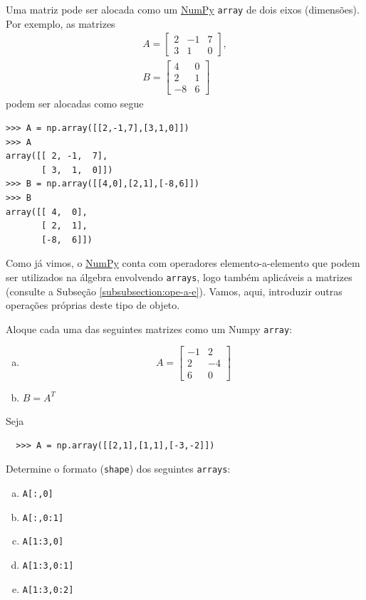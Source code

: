 \documentclass[12pt]{article}
\begin{document}
Uma matriz pode ser alocada como um \href{https://numpy.org/}{NumPy} \lstinline+array+ de dois eixos (dimensões). Por exemplo, as matrizes
\begin{gather}
  A =
  \begin{bmatrix}
    2 & -1 & 7\\
    3 & 1 & 0
  \end{bmatrix},\\
  B =
  \begin{bmatrix}
    4 & 0\\
    2 & 1\\
   -8 & 6
  \end{bmatrix}
\end{gather}
podem ser alocadas como segue
\begin{lstlisting}
>>> A = np.array([[2,-1,7],[3,1,0]])
>>> A
array([[ 2, -1,  7],
       [ 3,  1,  0]])
>>> B = np.array([[4,0],[2,1],[-8,6]])
>>> B
array([[ 4,  0],
       [ 2,  1],
       [-8,  6]])
\end{lstlisting}


Como já vimos, o \href{https://numpy.org/}{NumPy} conta com operadores elemento-a-elemento que podem ser utilizados na álgebra envolvendo \lstinline+arrays+, logo também aplicáveis a matrizes (consulte a Subseção \ref{subsubsection:ope-a-e}). Vamos, aqui, introduzir outras operações próprias deste tipo de objeto.

\begin{exr}
  Aloque cada uma das seguintes matrizes como um Numpy \lstinline+array+:
  \begin{enumerate}[a)]
  \item
    \begin{equation}
      A =
      \begin{bmatrix}
        -1 & 2\\
        2 & -4\\
        6 & 0
      \end{bmatrix}
    \end{equation}
  \item $B = A^T$ 
  \end{enumerate}
\end{exr}

\begin{exr}
  Seja
  \begin{lstlisting}
  >>> A = np.array([[2,1],[1,1],[-3,-2]])
  \end{lstlisting}
  Determine o formato (\lstinline+shape+) dos seguintes \lstinline+arrays+:
  \begin{enumerate}[a)]
  \item \lstinline+A[:,0]+
  \item \lstinline+A[:,0:1]+
  \item \lstinline+A[1:3,0]+
  \item \lstinline+A[1:3,0:1]+
  \item \lstinline+A[1:3,0:2]+
  \end{enumerate}
\end{exr}
\end{document}
